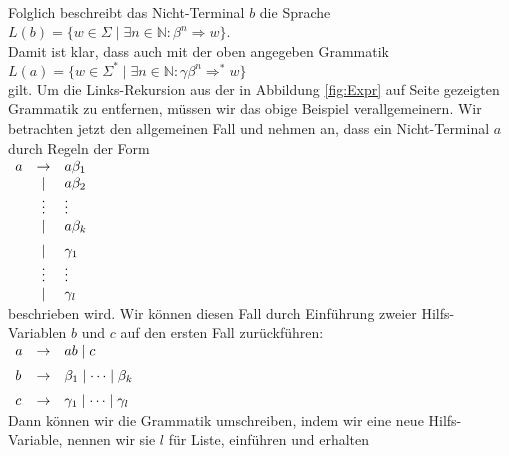 \\[0.2cm]
Folglich beschreibt das Nicht-Terminal $b$ die Sprache
\\[0.2cm]
\hspace*{1.3cm} $L(b) = \bigl\{ w \in \Sigma \mid \exists n \in \mathbb{N}: \beta^n \Rightarrow w
\bigr\}$.
\\[0.2cm]
Damit ist klar, dass auch mit der oben angegeben Grammatik
\\[0.2cm]
\hspace*{1.3cm} $L(a) = \bigl\{ w \in \Sigma^* \mid \exists n \in \mathbb{N}: \gamma \beta^n
\Rightarrow^* w \bigr\}$
\\[0.2cm]
gilt.  Um die Links-Rekursion aus der in Abbildung \ref{fig:Expr} auf Seite \pageref{fig:Expr}
gezeigten Grammatik zu entfernen, m\"ussen wir das obige Beispiel verallgemeinern.  Wir betrachten
jetzt den allgemeinen Fall und nehmen an, dass ein Nicht-Terminal $a$ durch Regeln der Form
\\[0.2cm]
\hspace*{1.3cm} $
\begin{array}[t]{lcl}
a & \rightarrow & a \beta_1 \\
  & \mid        & a \beta_2 \\
  & \vdots      & \vdots    \\
  & \mid        & a \beta_k \\[0.2cm]
  & \mid        & \gamma_1  \\
  & \vdots      & \vdots    \\
  & \mid        & \gamma_l
\end{array}
$
\\[0.2cm]
beschrieben wird.  Wir k\"onnen diesen Fall durch Einf\"uhrung zweier Hilfs-Variablen $b$ und $c$ auf
den ersten Fall zur\"uckf\"uhren:
\\[0.2cm]
\hspace*{1.3cm}
$
\begin{array}[t]{lcl}
a & \rightarrow & a b \mid c                         \\[0.2cm]
b & \rightarrow & \beta_1 \mid \cdots \mid \beta_k   \\[0.2cm]
c & \rightarrow & \gamma_1 \mid \cdots \mid \gamma_l
\end{array}
$
\\[0.2cm]
Dann k\"onnen wir die Grammatik umschreiben, indem wir eine neue Hilfs-Variable, nennen wir sie $l$
f\"ur Liste, einf\"uhren und erhalten
\\[0.2cm]
\hspace*{1.3cm}
